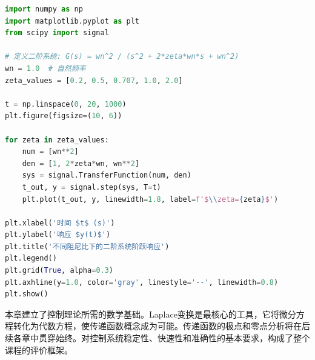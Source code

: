 \begin{lstlisting}[language=Python]
import numpy as np
import matplotlib.pyplot as plt
from scipy import signal

# 定义二阶系统: G(s) = wn^2 / (s^2 + 2*zeta*wn*s + wn^2)
wn = 1.0  # 自然频率
zeta_values = [0.2, 0.5, 0.707, 1.0, 2.0]

t = np.linspace(0, 20, 1000)
plt.figure(figsize=(10, 6))

for zeta in zeta_values:
    num = [wn**2]
    den = [1, 2*zeta*wn, wn**2]
    sys = signal.TransferFunction(num, den)
    t_out, y = signal.step(sys, T=t)
    plt.plot(t_out, y, linewidth=1.8, label=f'$\\zeta={zeta}$')

plt.xlabel('时间 $t$ (s)')
plt.ylabel('响应 $y(t)$')
plt.title('不同阻尼比下的二阶系统阶跃响应')
plt.legend()
plt.grid(True, alpha=0.3)
plt.axhline(y=1.0, color='gray', linestyle='--', linewidth=0.8)
plt.show()
\end{lstlisting}

\begin{remark}
本章建立了控制理论所需的数学基础。Laplace变换是最核心的工具，它将微分方程转化为代数方程，使传递函数概念成为可能。传递函数的极点和零点分析将在后续各章中贯穿始终。对控制系统稳定性、快速性和准确性的基本要求，构成了整个课程的评价框架。
\end{remark}
